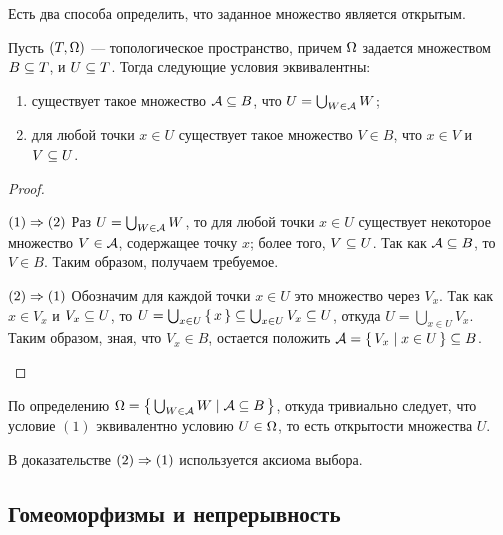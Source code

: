 \documentclass[main]{subfiles}
\begin{document}
Есть два способа определить, что заданное множество является открытым.

\begin{theorem} Пусть $ (T, \Omega) $ --- топологическое пространство,
	причем $ \Omega $ задается множеством $ B \subseteq T $, и $ U \subseteq T $. Тогда следующие условия эквивалентны:
	\begin{enumerate}
		\item существует такое множество $ \mathcal{A} \subseteq B $, что $ U = \bigcup_{W \in \mathcal{A}} W $;
		\item для любой точки $ x \in U $ существует такое множество $ V \in B $, что $ x \in V $ и $ V \subseteq U $.
	\end{enumerate}
\end{theorem}

\begin{proof} \leavevmode
	\begin{multiproof}
		\item[$(1)\Rightarrow(2)$] Раз $ U = \bigcup_{W \in \mathcal{A}} W $, то для любой точки $ x \in U $ существует
			некоторое множество $ V \in \mathcal{A} $, содержащее точку $ x $; более того, $ V \subseteq U $.
			Так как $ \mathcal{A} \subseteq B $, то $ V \in B $. Таким образом, получаем требуемое.
		\item[$(2)\Rightarrow(1)$] Обозначим для каждой точки $ x \in U $ это множество через $ V_x $.
			Так как $ x \in V_x $ и $ V_x \subseteq U $, то
			$ U = \bigcup_{x \in U} \left\{\, x \,\right\} \subseteq \bigcup_{x \in U} V_x \subseteq U $, откуда
			$ U = \bigcup_{x \in U} V_x $. Таким образом, зная, что $ V_x \in B $, остается положить
			$ \mathcal{A} = \left\{\, V_x \mid x \in U \,\right\} \subseteq B $.
	\end{multiproof}
\end{proof}

\begin{remark}
	По определению $ \Omega = \left\{\, \bigcup_{W \in \mathcal{A}} W \mid \mathcal{A} \subseteq B \,\right\} $, откуда тривиально следует, что
	условие $(1)$ эквивалентно условию $ U \in \Omega $, то есть открытости множества $ U $.
\end{remark}

\begin{remark}
	В доказательстве $(2)\Rightarrow(1)$ используется аксиома выбора.
\end{remark}

\subsection{Гомеоморфизмы и непрерывность}
\end{document}
